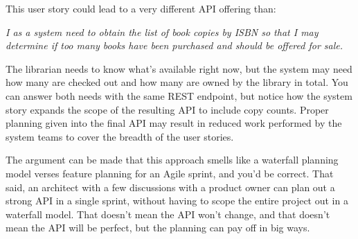 This user story could lead to a very different API offering than:

\textit{I as a system need to obtain the list of book copies by ISBN so that I may determine if too many books have been purchased and should be offered for sale.}

The librarian needs to know what's available right now, but the system may need how many are checked out and how many are owned by the library in total.  You can answer both needs with the same REST endpoint, but notice how the system story expands the scope of the resulting API to include copy counts.  Proper planning given into the final API may result in reduced work performed by the system teams to cover the breadth of the user stories.

The argument can be made that this approach smells like a waterfall planning model verses feature planning for an Agile sprint, and you'd be correct.  That said, an architect with a few discussions with a product owner can plan out a strong API in a single sprint, without having to scope the entire project out in a waterfall model.  That doesn't mean the API won't change, and that doesn't mean the API will be perfect, but the planning can pay off in big ways.
